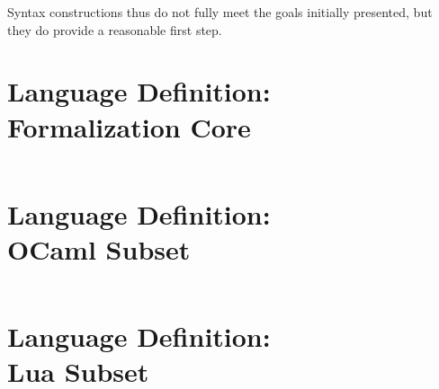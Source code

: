 \documentclass{kththesis}
\begin{document}
Syntax constructions thus do not fully meet the goals initially presented, but they do provide a reasonable first step.

\printbibliography[heading=bibintoc]

\appendix

\chapter[Language Definition: Formalization Core]{Language Definition:\\Formalization Core} \label{sec:formal-core}

\inputminted{syncon}{implementation/languages/formalization-example/core}

\chapter[Language Definition: OCaml Subset]{Language Definition:\\OCaml Subset} \label{sec:appendix-ocaml}

\inputminted{syncon}{implementation/languages/ocaml/language}

\chapter[Language Definition: Lua Subset]{Language Definition:\\Lua Subset} \label{sec:appendix-lua}

\inputminted{syncon}{implementation/languages/lua/language}
\end{document}

